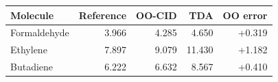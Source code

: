 \begin{tabular}{lrrrr}\toprule
Molecule & Reference & OO-CID & TDA & OO error\\\midrule
Formaldehyde & 3.966 & 4.285 & 4.650 & +0.319\\
Ethylene & 7.897 & 9.079 & 11.430 & +1.182\\
Butadiene & 6.222 & 6.632 & 8.567 & +0.410\\
\bottomrule\end{tabular}
